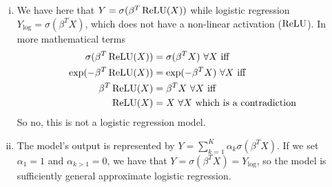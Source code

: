 \begin{enumerate}[(i)]
    \item We have here that $Y = \sigma(\beta^T \operatorname{ReLU}(X))$ while logistic regression $Y_{\log} = \sigma(\beta^T X)$, which does not have a non-linear activation ($\operatorname{ReLU}$). In more mathematical terms
    \begin{align*}
        \sigma(\beta^T \operatorname{ReLU}(X)) &= \sigma(\beta^T X)~\forall X  ~\text{iff}\\
        \exp(-\beta^T \operatorname{ReLU}(X)) &= \exp(-\beta^T X)~\forall X  ~\text{iff}\\
        \beta^T \operatorname{ReLU}(X) &= \beta^T X ~\forall X ~\text{iff}\\
        \operatorname{ReLU}(X) &= X ~\forall X ~\text{which is a contradiction}
    \end{align*}
    So no, this is not a logistic regression model.
    
    \item The model's output is represented by $Y = \sum_{k=1}^K \alpha_k \sigma(\beta^T X)$. If we set $\alpha_1 = 1$ and $\alpha_{k > 1} = 0$, we have that $ Y = \sigma(\beta^T X) = Y_{\log}$, so the model is sufficiently general approximate logistic regression.
    
    
\end{enumerate}